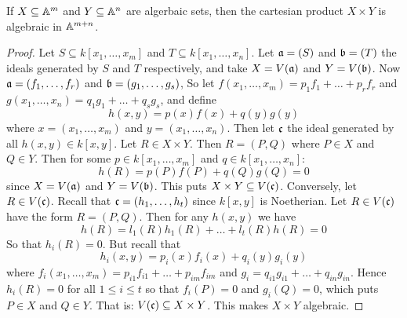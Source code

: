 \begin{proposition}\label{proposition_10.1.4}
  If $X \subseteq \A^m$ and $Y \subseteq \A^n$ are algerbaic sets,
  then the cartesian product $X \times Y$ is algebraic in $\A^{m+n}$.
\end{proposition}
\begin{proof}
  Let $S \subseteq k[x_1, \dots, x_m]$ and $T \subseteq k[x_1, \dots,
  x_n]$. Let $\af=(S)$ and $\bf=(T)$ the ideals generated by $S$
  and $T$ respectively, and take $X=V(\af)$ and $Y=V(\bf)$. Now
  $\af=(f_1, \dots, f_r)$ and $\bf=(g_1, \dots, g_s)$, So let
  $f(x_1, \dots, x_m)=p_1f_1+\dots+p_rf_r$ and
  $g(x_1, \dots, x_n)=q_1g_1+\dots+q_sg_s$, and define
  \begin{equation*}
    h(x,y)=p(x)f(x)+q(y)g(y)
  \end{equation*}
  where $x=(x_1, \dots, x_m)$ and $y=(x_1, \dots, x_n)$. Then let
  $\cf$ the ideal generated by all $h(x,y) \in k[x,y]$. Let $R \in X
  \times Y$. Then $R=(P,Q)$ where $P \in X$ and $Q \in Y$. Then for
  some $p \in k[x_1, \dots, x_m]$ and $q \in k[x_1, \dots, x_n]$:
  \begin{equation*}
    h(R)=p(P)f(P)+q(Q)g(Q)=0
  \end{equation*}
  since $X=V(\af)$ and $Y=V(\bf)$. This puts $X \times Y \subseteq
  V(\cf)$. Conversely, let $R \in V(\cf)$. Recall that $\cf=(h_1,
  \dots, h_t)$ since $k[x,y]$ is Noetherian. Let $R \in V(\cf)$ have
  the form $R=(P,Q)$. Then for any $h(x,y)$ we have
  \begin{equation*}
    h(R)=l_1(R)h_1(R)+\dots+l_t(R)h(R)=0
  \end{equation*}
  So that $h_i(R)=0$. But recall that
  \begin{equation*}
    h_i(x,y)=p_i(x)f_i(x)+q_i(y)g_i(y)
  \end{equation*}
  where $f_i(x_1, \dots, x_m)=p_{i1}f_{i1}+\dots+p_{im}f_{im}$ and
  $g_i=q_{i1}g_{i1}+\dots+q_{in}g_{in}$. Hence $h_i(R)=0$ for all $1
  \leq i \leq t$ so that $f_i(P)=0$ and $g_i(Q)=0$, which puts $P \in
  X$ and $Q \in Y$. That is: $V(\cf) \subseteq X \times Y$. This makes
  $X \times Y$ algebraic.
\end{proof}

